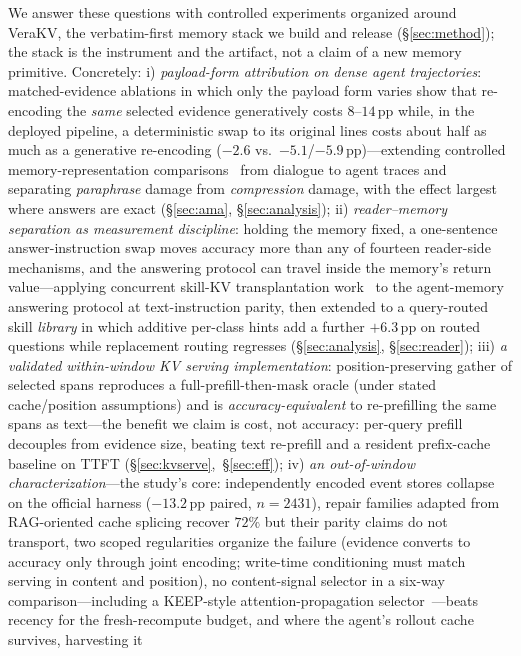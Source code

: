 \documentclass{article} %
\newcommand{\pp}{\,\mathrm{pp}}
\newcommand{\kvm}{VeraKV}
\begin{document}
We answer these questions with controlled experiments organized around \kvm{}, the
verbatim-first memory stack we build and release (\S\ref{sec:method}); the stack is
the instrument and the artifact, not a claim of a new memory primitive. Concretely:
i) \emph{payload-form attribution on dense agent trajectories}: matched-evidence
ablations in which only the payload form varies show that re-encoding the
\emph{same} selected evidence generatively costs $8$--$14\pp$ while, in the deployed pipeline, a deterministic
swap to its original lines costs about half as much as a generative re-encoding ($-2.6$ vs.\ $-5.1$/$-5.9\pp$)---extending controlled
memory-representation comparisons~\citep{verbatimchunks} from dialogue to agent
traces and separating \emph{paraphrase} damage from \emph{compression} damage, with
the effect largest where answers are exact (\S\ref{sec:ama}, \S\ref{sec:analysis});
ii) \emph{reader--memory separation as measurement discipline}: holding the memory
fixed, a one-sentence answer-instruction swap moves accuracy more than any of
fourteen reader-side mechanisms, and the answering protocol can travel inside the
memory's return value---applying concurrent skill-KV transplantation
work~\citep{kvnotes} to the agent-memory answering protocol at text-instruction
parity, then extended to a query-routed skill \emph{library} in which additive per-class
hints add a further $+6.3\pp$ on routed questions while replacement routing regresses
(\S\ref{sec:analysis}, \S\ref{sec:reader}); iii) \emph{a validated
within-window KV serving implementation}: position-preserving gather of selected
spans reproduces a full-prefill-then-mask oracle (under stated cache/position
assumptions) and is \emph{accuracy-equivalent} to re-prefilling the same spans as
text---the benefit we claim is cost, not accuracy: per-query prefill decouples from
evidence size, beating text re-prefill and a resident prefix-cache baseline on TTFT
(\S\ref{sec:kvserve},~\S\ref{sec:eff}); iv) \emph{an out-of-window
characterization}---the study's core: independently encoded event stores collapse
on the official harness ($-13.2\pp$ paired, $n{=}2431$), repair families adapted
from RAG-oriented cache splicing recover $72\%$ but their parity claims do not
transport, two scoped regularities organize the failure (evidence converts to
accuracy only through joint encoding; write-time conditioning must match serving in
content and position), no content-signal selector in a six-way comparison---including a KEEP-style
attention-propagation selector~\citep{keep}---beats recency for the
fresh-recompute budget, and where the agent's rollout cache survives, harvesting it
\end{document}
